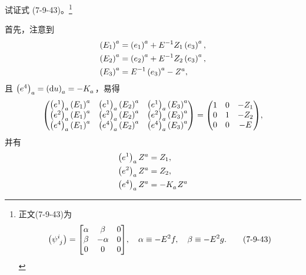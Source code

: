 \begin{xiti}
	\item 试证式 (7-9-43)。\footnote{正文(7-9-43)为
	\begin{equation*}
		\left( \tensor{\psi}{^i_j} \right) = \mqty[
			\alpha & \beta & 0 \\
			\beta & -\alpha & 0\\
			0 & 0 & 0
		]
		\qc \alpha \equiv - E^2 f \qc \beta \equiv - E^2 g. \tag{7-9-43}
	\end{equation*}}
	\begin{zm}
		首先，注意到
		\begin{equation*}
			\begin{split}
				\tensor{\left( E_1 \right)}{^a} &= \tensor{\left( e_1 \right)}{^a} + E^{-1} Z_1 \tensor{\left( e_3 \right)}{^a},\\
				\tensor{\left( E_2 \right)}{^a} &= \tensor{\left( e_2 \right)}{^a} + E^{-1} Z_2 \tensor{\left( e_3 \right)}{^a},\\
				\tensor{\left( E_3 \right)}{^a} &= E^{-1} \tensor{\left( e_3 \right)}{^a} - \tensor{Z}{^a},
			\end{split}
		\end{equation*}
		且 $\tensor{\left( e^4 \right)}{_a} = \tensor{\left( \dd{u} \right)}{_a} = - \tensor{K}{_a}$，易得
		\begin{equation*}
			\mqty(
				\tensor{\left( e^1 \right)}{_a} \tensor{\left( E_1 \right)}{^a} & \tensor{\left( e^1 \right)}{_a} \tensor{\left( E_2 \right)}{^a} & \tensor{\left( e^1 \right)}{_a} \tensor{\left( E_3 \right)}{^a}\\
				\tensor{\left( e^2 \right)}{_a} \tensor{\left( E_1 \right)}{^a} & \tensor{\left( e^2 \right)}{_a} \tensor{\left( E_2 \right)}{^a} & \tensor{\left( e^2 \right)}{_a} \tensor{\left( E_3 \right)}{^a}\\
				\tensor{\left( e^4 \right)}{_a} \tensor{\left( E_1 \right)}{^a} & \tensor{\left( e^4 \right)}{_a} \tensor{\left( E_2 \right)}{^a} & \tensor{\left( e^4 \right)}{_a} \tensor{\left( E_3 \right)}{^a}
			)
			=
			\mqty(
				1 & 0 & - Z_1\\
				0 & 1 & - Z_2\\
				0 & 0 & - E
			),
		\end{equation*}
		并有
		\begin{equation*}
			\begin{split}
				\tensor{\left( e^1 \right)}{_a} \tensor{Z}{^a} &= Z_1,\\
				\tensor{\left( e^2 \right)}{_a} \tensor{Z}{^a} &= Z_2,\\
				\tensor{\left( e^4 \right)}{_a} \tensor{Z}{^a} &= - \tensor{K}{_a} \tensor{Z}{^a}\\

\end{split}
\end{equation*}
\end{zm}
\end{xiti}
